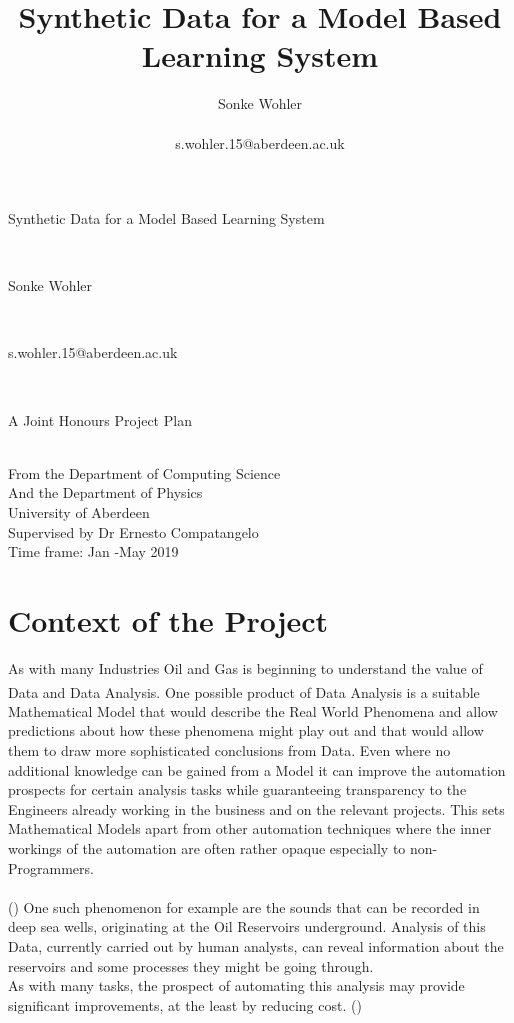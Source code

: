 \documentclass{article}
\title{
    Synthetic Data for a Model Based Learning System
}
\author{Sonke Wohler \\
\begin{small}
    s.wohler.15@aberdeen.ac.uk
\end{small}
}
\date{\begin{small}\today\end{small}}
\begin{document}
\thispagestyle{empty}

\begin{center}
\begin{LARGE}Synthetic Data for a Model Based Learning System\end{LARGE}
\bigskip
\bigskip
\\\begin{Large}Sonke Wohler\end{Large}
\\\begin{large}s.wohler.15@aberdeen.ac.uk\end{large}
\bigskip
\smallskip
\\\begin{large}A Joint Honours Project Plan\end{large}
\smallskip
\\From the Department of Computing Science
\\ And the Department of Physics
\medskip
\\University of Aberdeen
\bigskip
\smallskip
\\Supervised by Dr Ernesto Compatangelo
\medskip
\\Time frame: Jan -May 2019
\end{center}
\clearpage

\section{Context of the Project}


As with many Industries Oil and Gas is beginning to understand the value of Data and Data Analysis. \textsuperscript{\cite{chickenEgg,cloudOil}}
One possible product of Data Analysis is a suitable Mathematical Model that would describe the Real World Phenomena and allow predictions about how these phenomena might play out and that would allow them to draw more sophisticated conclusions from Data. 
Even where no additional knowledge can be gained from a Model it can improve the automation prospects for certain analysis tasks while guaranteeing transparency to the Engineers already working in the business and on the relevant projects. This sets Mathematical Models apart from other automation techniques where the inner workings of the automation are often rather opaque especially to non-Programmers. 
\\\\()
One such phenomenon for example are the sounds that can be recorded in deep sea wells, originating at the Oil Reservoirs underground. Analysis of this Data, currently carried out by human analysts, can reveal information about the reservoirs and some processes they might be going through.
\\ As with many tasks, the prospect of automating this analysis may provide significant improvements, at the least by reducing cost.
()
\end{document}
